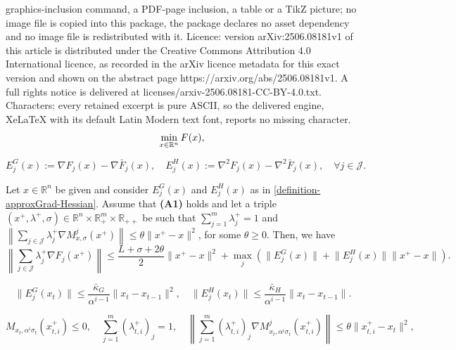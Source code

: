 \documentclass[10pt,a4paper]{amsart}
\newcommand{\J}{\mathcal{J}}
\newcommand{\R}{\mathbb{R}}
\begin{document}
graphics-inclusion command, a PDF-page inclusion, a table or a TikZ picture; no image file is copied into this package, the package declares no asset dependency and no image file is redistributed with it. Licence: version arXiv:2506.08181v1 of this article is distributed under the Creative Commons Attribution 4.0 International licence, as recorded in the arXiv licence metadata for this exact version and shown on the abstract page https://arxiv.org/abs/2506.08181v1. A full rights notice is delivered at licenses/arxiv-2506.08181-CC-BY-4.0.txt. Characters: every retained excerpt is pure ASCII, so the delivered engine, XeLaTeX with its default Latin Modern text font, reports no missing character.
\begin{equation} \label{vectorproblem}
\min_{x \in \R^n}    F(x),  \\
\end{equation}

\begin{equation}\label{definition-approxGrad-Hessian}
E^G_{j}(x):=\nabla F_j(x)-\nabla\bar F_j(x),  \quad E^H_{j}(x):=\nabla^{2}F_j(x)-\nabla^{2}\bar F_j(x), \quad \forall j\in \J.
\end{equation}

\begin{lemma}
\label{lem3:basic-gt+1<Deltax}
Let $x\in \R^n$ be given and consider $E^G_{j}(x)$ and  $E^H_{j}(x)$ as in  \eqref{definition-approxGrad-Hessian}. Assume that {\bf (A1)} holds and let a triple $(x^{+},\lambda^{+},\sigma) \in \R^n\times \R^m_+\times\R_{++} $ be such that $\sum_{j=1}^{m} \lambda^+_j=1$ and $\left\|\sum_{j \in \J}\lambda^+_j\nabla M_{x,\sigma}^j(x^{+})\right\|\leq \theta\|x^+- x\|^2$, for some $\theta\geq 0$. Then, we have   
\begin{equation*}
\left\|\sum_{j \in \J}\lambda^+_j\nabla F_j(x^{+})\right\|\leq \frac{L+\sigma+2\theta}{2}\|x^{+}-x\|^2+\max_j\left(\|E_j^G(x)\|+ {\|E_j^H(x)\|\|x^{+}-x\|}\right). 
\end{equation*} 
\end{lemma}

\begin{equation}
\|E^G_j(x_t)\|\leq\frac{\bar \kappa_{G}}{\alpha^{i-1}}\|x_t-x_{t-1}\|^2,  \quad \|E^H_j(x_t)\|\leq\frac{\bar \kappa_{H}}{\alpha^{i-1}}\|x_t-x_{t-1}\|.
\label{ineq:ApproxGrad-Hess}
\end{equation}

\begin{equation}
M_{x_{t},\alpha^{i}\sigma_{t}}(x^{+}_{t,i})\leq 0, \quad \sum_{j=1}^{m} (\lambda^+_{t,i})_j=1, \quad \left \|\sum_{j=1}^{m} (\lambda^+_{t,i})_j\nabla M_{x_t,\alpha^i\sigma_t}^j(x_{t,i}^+)\right\|\leq \theta  \|x_{t,i}^+-x_t\|^2,
\label{eq:subprob-Alg1}
\end{equation}
\end{document}
